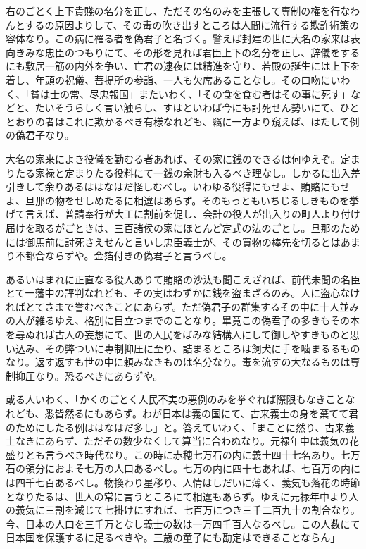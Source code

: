\documentclass[a4paper, platex, dvipdfmx]{jsarticle}
\begin{document}
右のごとく上下貴賤の名分を正し、ただその名のみを主張して専制の権を行なわんとするの原因よりして、その毒の吹き出すところは人間に流行する欺詐術策の容体なり。この病に罹る者を偽君子と名づく。譬えば封建の世に大名の家来は表向きみな忠臣のつもりにて、その形を見れば君臣上下の名分を正し、辞儀をするにも敷居一筋の内外を争い、亡君の逮夜には精進を守り、若殿の誕生には上下を着し、年頭の祝儀、菩提所の参詣、一人も欠席あることなし。その口吻にいわく、「貧は士の常、尽忠報国」またいわく、「その食を食む者はその事に死す」などと、たいそうらしく言い触らし、すはといわば今にも討死せん勢いにて、ひととおりの者はこれに欺かるべき有様なれども、竊に一方より窺えば、はたして例の偽君子なり。

大名の家来によき役儀を勤むる者あれば、その家に銭のできるは何ゆえぞ。定まりたる家禄と定まりたる役料にて一銭の余財も入るべき理なし。しかるに出入差引きして余りあるははなはだ怪しむべし。いわゆる役得にもせよ、賄賂にもせよ、旦那の物をせしめたるに相違はあらず。そのもっともいちじるしきものを挙げて言えば、普請奉行が大工に割前を促し、会計の役人が出入りの町人より付け届けを取るがごときは、三百諸侯の家にほとんど定式の法のごとし。旦那のためには御馬前に討死さえせんと言いし忠臣義士が、その買物の棒先を切るとはあまり不都合ならずや。金箔付きの偽君子と言うべし。

あるいはまれに正直なる役人ありて賄賂の沙汰も聞こえざれば、前代未聞の名臣とて一藩中の評判なれども、その実はわずかに銭を盗まざるのみ。人に盗心なければとてさまで誉むべきことにあらず。ただ偽君子の群集するその中に十人並みの人が雑るゆえ、格別に目立つまでのことなり。畢竟この偽君子の多きもその本を尋ぬれば古人の妄想にて、世の人民をばみな結構人にして御しやすきものと思い込み、その弊ついに専制抑圧に至り、詰まるところは飼犬に手を噛まるるものなり。返す返すも世の中に頼みなきものは名分なり。毒を流すの大なるものは専制抑圧なり。恐るべきにあらずや。

或る人いわく、「かくのごとく人民不実の悪例のみを挙ぐれば際限もなきことなれども、悉皆然るにもあらず。わが日本は義の国にて、古来義士の身を棄てて君のためにしたる例ははなはだ多し」と。答えていわく、「まことに然り、古来義士なきにあらず、ただその数少なくして算当に合わぬなり。元禄年中は義気の花盛りとも言うべき時代なり。この時に赤穂七万石の内に義士四十七名あり。七万石の領分におよそ七万の人口あるべし。七万の内に四十七あれば、七百万の内には四千七百あるべし。物換わり星移り、人情はしだいに薄く、義気も落花の時節となりたるは、世人の常に言うところにて相違もあらず。ゆえに元禄年中より人の義気に三割を減じて七掛けにすれば、七百万につき三千二百九十の割合なり。今、日本の人口を三千万となし義士の数は一万四千百人なるべし。この人数にて日本国を保護するに足るべきや。三歳の童子にも勘定はできることならん」
\end{document}
